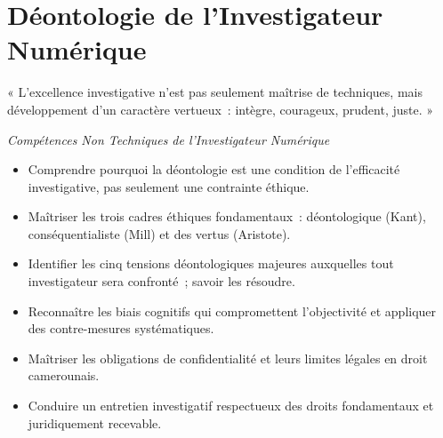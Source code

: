 
\chapter{Déontologie de l'Investigateur Numérique}
\label{chap:deonto}

\epigraph{%
    « L'excellence investigative n'est pas seulement maîtrise de techniques,
    mais développement d'un caractère vertueux~: intègre, courageux,
    prudent, juste. »%
}{\textit{Compétences Non Techniques de l'Investigateur Numérique}}


\begin{boxobjectifs}
\begin{itemize}
    \item Comprendre pourquoi la déontologie est une condition de
          l'efficacité investigative, pas seulement une contrainte éthique.
    \item Maîtriser les trois cadres éthiques fondamentaux~: déontologique
          (Kant), conséquentialiste (Mill) et des vertus (Aristote).
    \item Identifier les cinq tensions déontologiques majeures auxquelles
          tout investigateur sera confronté~; savoir les résoudre.
    \item Reconnaître les biais cognitifs qui compromettent l'objectivité
          et appliquer des contre-mesures systématiques.
    \item Maîtriser les obligations de confidentialité et leurs limites
          légales en droit camerounais.
    \item Conduire un entretien investigatif respectueux des droits
          fondamentaux et juridiquement recevable.
\end{itemize}
\end{boxobjectifs}

\bigskip

